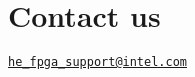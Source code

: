 \section*{Contact us}


\begin{DoxyItemize}
\item \href{mailto:he_fpga_support@intel.com}{\tt he\-\_\-fpga\-\_\-support@intel.\-com} 
\end{DoxyItemize}